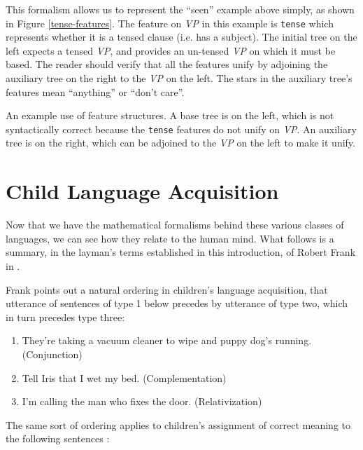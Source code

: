 \documentclass[12pt]{article}
\begin{document}
This formalism allows us to represent the ``seen'' example above simply,
as shown in Figure \ref{tense-features}.  The feature on \textit{VP} in
this example is \texttt{tense} which represents whether it is a tensed
clause (i.e. has a subject).  The initial tree on the left expects a
tensed \textit{VP}, and provides an un-tensed \textit{VP} on which it
must be based.  The reader should verify that all the features unify by
adjoining the auxiliary tree on the right to the \textit{VP} on the
left.  The stars in the auxiliary tree's features mean ``anything'' or
``don't care''.

\begin{Figure}
\begin{center}
\end{center}
\caption{An example use of feature structures.  A base tree is on the
left, which is not syntactically correct because the \texttt{tense}
features do not unify on \textit{VP}.  An auxiliary tree is on the
right, which can be adjoined to the \textit{VP} on the left to make
it unify.}
\label{tense-features}
\end{Figure}

\section{Child Language Acquisition}
\label{sec-child-language-acquisition}

Now that we have the mathematical formalisms behind these various
classes of languages, we can see how they relate to the human mind.
What follows is a summary, in the layman's terms established in this
introduction, of Robert Frank in \cite{Frank-2000}.

Frank points out a natural ordering in children's language acquisition,
that utterance of sentences of type 1 below precedes by utterance of
type two, which in turn precedes type three:

\begin{enumerate}
\item They're taking a vacuum cleaner to wipe and puppy dog's
running.  (Conjunction)
\item Tell Iris that I wet my bed. (Complementation)
\item I'm calling the man who fixes the door.  (Relativization)
\end{enumerate}

The same sort of ordering applies to children's assignment of correct
meaning to the following sentences \cite{Bloom-1980}:
\end{document}
